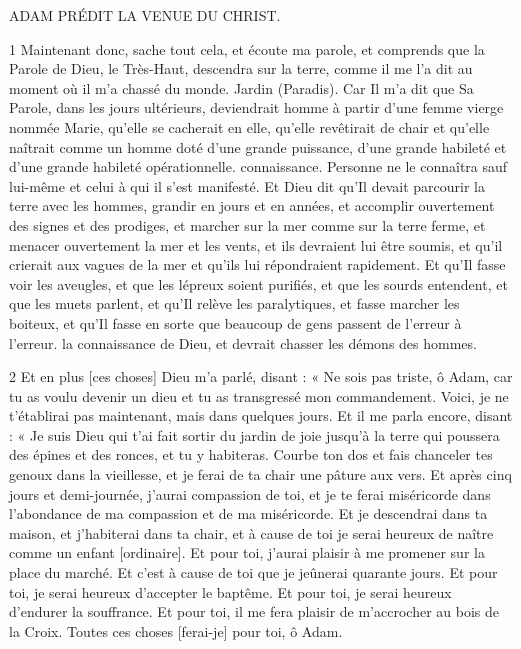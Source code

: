 \par ADAM PRÉDIT LA VENUE DU CHRIST.

\par 1 Maintenant donc, sache tout cela, et écoute ma parole, et comprends que la Parole de Dieu, le Très-Haut, descendra sur la terre, comme il me l'a dit au moment où il m'a chassé du monde. Jardin (Paradis). Car Il m'a dit que Sa Parole, dans les jours ultérieurs, deviendrait homme à partir d'une femme vierge nommée Marie, qu'elle se cacherait en elle, qu'elle revêtirait de chair et qu'elle naîtrait comme un homme doté d'une grande puissance, d'une grande habileté et d'une grande habileté opérationnelle. connaissance. Personne ne le connaîtra sauf lui-même et celui à qui il s'est manifesté. Et Dieu dit qu'Il devait parcourir la terre avec les hommes, grandir en jours et en années, et accomplir ouvertement des signes et des prodiges, et marcher sur la mer comme sur la terre ferme, et menacer ouvertement la mer et les vents, et ils devraient lui être soumis, et qu'il crierait aux vagues de la mer et qu'ils lui répondraient rapidement. Et qu'Il fasse voir les aveugles, et que les lépreux soient purifiés, et que les sourds entendent, et que les muets parlent, et qu'Il relève les paralytiques, et fasse marcher les boiteux, et qu'Il fasse en sorte que beaucoup de gens passent de l'erreur à l'erreur. la connaissance de Dieu, et devrait chasser les démons des hommes.

\par 2 Et en plus [ces choses] Dieu m'a parlé, disant : « Ne sois pas triste, ô Adam, car tu as voulu devenir un dieu et tu as transgressé mon commandement. Voici, je ne t'établirai pas maintenant, mais dans quelques jours. Et il me parla encore, disant : « Je suis Dieu qui t'ai fait sortir du jardin de joie jusqu'à la terre qui poussera des épines et des ronces, et tu y habiteras. Courbe ton dos et fais chanceler tes genoux dans la vieillesse, et je ferai de ta chair une pâture aux vers. Et après cinq jours et demi-journée, j'aurai compassion de toi, et je te ferai miséricorde dans l'abondance de ma compassion et de ma miséricorde. Et je descendrai dans ta maison, et j'habiterai dans ta chair, et à cause de toi je serai heureux de naître comme un enfant [ordinaire]. Et pour toi, j'aurai plaisir à me promener sur la place du marché. Et c'est à cause de toi que je jeûnerai quarante jours. Et pour toi, je serai heureux d'accepter le baptême. Et pour toi, je serai heureux d'endurer la souffrance. Et pour toi, il me fera plaisir de m'accrocher au bois de la Croix. Toutes ces choses [ferai-je] pour toi, ô Adam.

